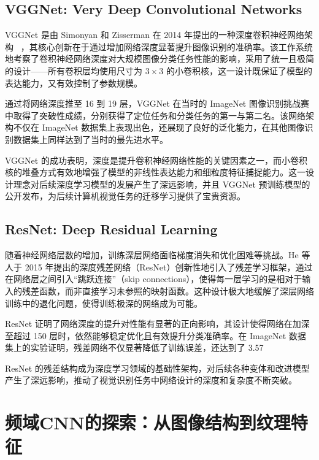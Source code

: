 \documentclass[12pt]{article}
\begin{document}
\subsection{VGGNet: Very Deep Convolutional Networks}
VGGNet 是由 Simonyan 和 Zisserman 在 2014 年提出的一种深度卷积神经网络架构 ~\cite{simonyan2014very}，其核心创新在于通过增加网络深度显著提升图像识别的准确率。该工作系统地考察了卷积神经网络深度对大规模图像分类任务性能的影响，采用了统一且极简的设计——所有卷积层均使用尺寸为 $3 \times 3$ 的小卷积核，这一设计既保证了模型的表达能力，又有效控制了参数规模。

通过将网络深度推至 16 到 19 层，VGGNet 在当时的 ImageNet 图像识别挑战赛中取得了突破性成绩，分别获得了定位任务和分类任务的第一与第二名。该网络架构不仅在 ImageNet 数据集上表现出色，还展现了良好的泛化能力，在其他图像识别数据集上同样达到了当时的最先进水平。

VGGNet 的成功表明，深度是提升卷积神经网络性能的关键因素之一，而小卷积核的堆叠方式有效地增强了模型的非线性表达能力和细粒度特征捕捉能力。这一设计理念对后续深度学习模型的发展产生了深远影响，并且 VGGNet 预训练模型的公开发布，为后续计算机视觉任务的迁移学习提供了宝贵资源。

\subsection{ResNet: Deep Residual Learning}
随着神经网络层数的增加，训练深层网络面临梯度消失和优化困难等挑战。He 等人于 2015 年提出的深度残差网络（ResNet）创新性地引入了残差学习框架，通过在网络层之间引入“跳跃连接”（skip connections），使得每一层学习的是相对于输入的残差函数，而非直接学习未参照的映射函数。这种设计极大地缓解了深层网络训练中的退化问题，使得训练极深的网络成为可能。

ResNet 证明了网络深度的提升对性能有显著的正向影响，其设计使得网络在加深至超过 150 层时，依然能够稳定优化且有效提升分类准确率。在 ImageNet 数据集上的实验证明，残差网络不仅显著降低了训练误差，还达到了 3.57%

ResNet 的残差结构成为深度学习领域的基础性架构，对后续各种变体和改进模型产生了深远影响，推动了视觉识别任务中网络设计的深度和复杂度不断突破。

\section{频域CNN的探索：从图像结构到纹理特征}
\end{document}
